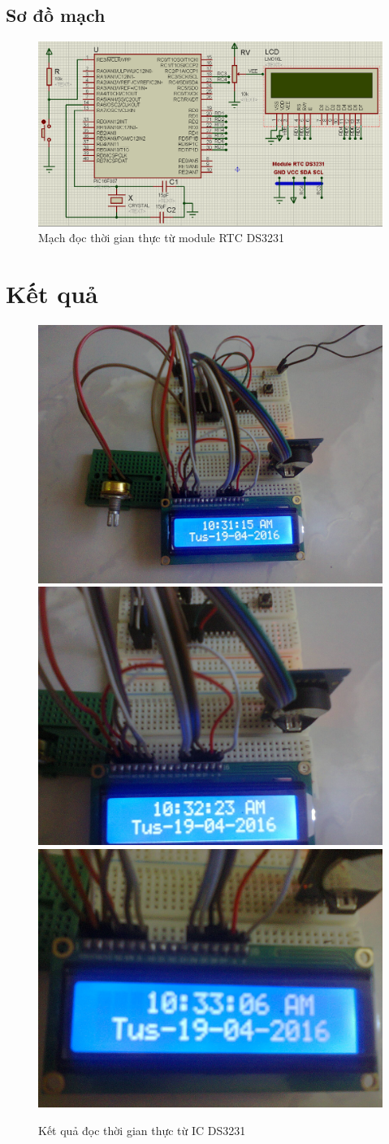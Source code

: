 \subsection*{Sơ đồ mạch}
\begin{figure}[!h]
\begin{center}
\includegraphics[scale=0.5]{bai-6/image/BAI-6-2}
\end{center}
\caption{Mạch đọc thời gian thực từ module RTC DS3231}
\end{figure}
\section*{Kết quả}
\begin{figure}[!h]
\begin{center}
  {\includegraphics[width=.3\linewidth]{bai-6/image/6-2-1}}
  {\includegraphics[width=.3\linewidth]{bai-6/image/6-2-2}}
  {\includegraphics[width=.3\linewidth]{bai-6/image/6-2-3}}
\end{center}
\caption{Kết quả đọc thời gian thực từ IC DS3231}
\end{figure}
